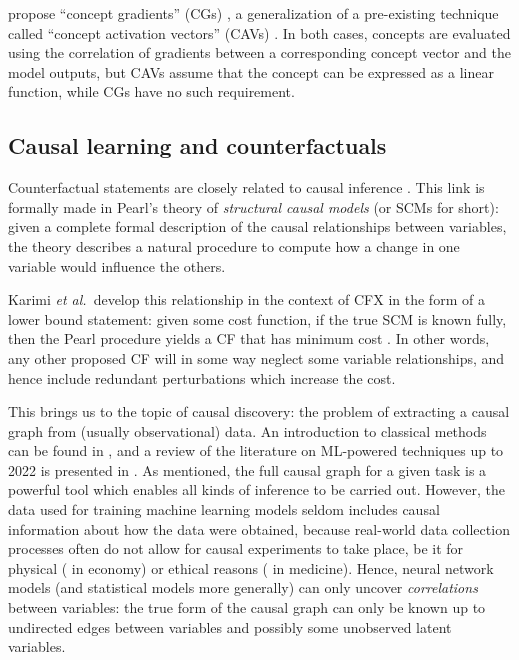 \documentclass[../main.tex]{subfiles}
\begin{document}
\citeauthor{baiConcept2022} propose ``concept gradients'' (CGs) \cite{baiConcept2022}, a generalization of a pre-existing technique called ``concept activation vectors'' (CAVs) \cite{kimInterpretability2018}.
In both cases, concepts are evaluated using the correlation of gradients between a corresponding concept vector and the model outputs, but CAVs assume that the concept can be expressed as a linear function, while CGs have no such requirement.



\subsection{Causal learning and counterfactuals}


Counterfactual statements are closely related to causal inference \cite{morganCounterfactuals2015}.
This link is formally made in Pearl's theory of \emph{structural causal models} (or SCMs for short): given a complete formal description of the causal relationships between variables, the theory describes a natural procedure to compute how a change in one variable would influence the others. 

Karimi \textsl{et al.}~develop this relationship in the context of CFX in the form of a lower bound statement: given some cost function, if the true SCM is known fully, then the Pearl procedure yields a CF that has minimum cost \cite{karimiAlgorithmic2020}.
In other words, any other proposed CF will in some way neglect some variable relationships, and hence include redundant perturbations which increase the cost.

This brings us to the topic of causal discovery: the problem of extracting a causal graph from (usually observational) data.
An introduction to classical methods can be found in \cite{cunninghamCausal2021}, and a review of the literature on ML-powered techniques up to 2022 is presented in \cite{vowelsYa2023}.
As mentioned, the full causal graph for a given task is a powerful tool which enables all kinds of inference to be carried out.
However, the data used for training machine learning models seldom includes causal information about how the data were obtained, because real-world data collection processes often do not allow for causal experiments to take place, be it for physical (\eg{} in economy) or ethical reasons (\eg{} in medicine).
Hence, neural network models (and statistical models more generally) can only uncover \emph{correlations} between variables: the true form of the causal graph can only be known up to undirected edges between variables and possibly some unobserved latent variables.
\end{document}
